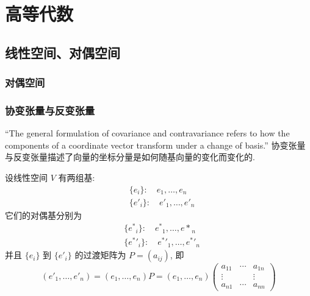\documentclass{book}
\begin{document}
    \tableofcontents
    \newpage
    
    \chapter{高等代数}
	\section{线性空间、对偶空间}
        \subsection{对偶空间}

        \subsection{协变张量与反变张量}

        “The general formulation of covariance and contravariance refers to 
        how the components of a coordinate vector transform under a change of basis.”
        协变张量与反变张量描述了向量的坐标分量是如何随基向量的变化而变化的.

        设线性空间 $V$ 有两组基:
        \begin{align*}
            &\{e_i\}:\quad e_1,\dots,e_n \\
            &\{{e}'_i\}:\quad {e'}_1,\dots,{e'}_n
        \end{align*}
        它们的对偶基分别为
        \begin{align*}
            &\{{e^*}_i\}:\quad {e^*}_1,\dots,{e*}_n \\
            &\{{e^*}'_i\}:\quad {e^*}'_1,\dots,{e^*}'_n
        \end{align*}
        并且 $\{e_i\}$ 到 $\{{e}'_i\}$ 的过渡矩阵为 $P = (a_{ij})$, 即
        \begin{equation*}
            ({e'}_1,\dots,{e'}_n) = (e_1,\dots,e_n)P = (e_1,\dots,e_n)
            \begin{pmatrix}
                a_{11} & \cdots & a_{1n} \\
                \vdots & & \vdots \\
                a_{n1} & \cdots & a_{nn}
            \end{pmatrix}
        \end{equation*}
\end{document}
